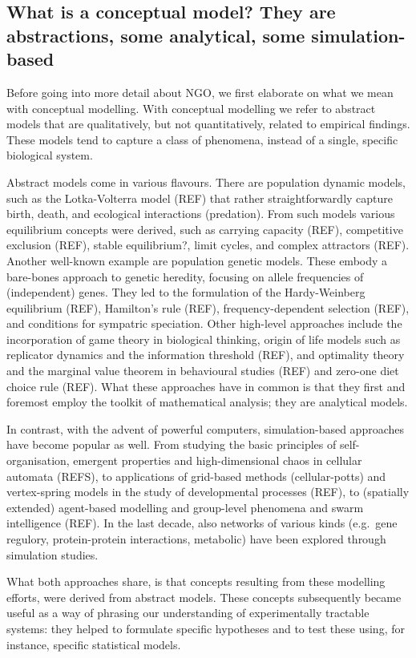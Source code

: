 \subsection{What is a conceptual model? They are abstractions, some analytical, some simulation-based}

Before going into more detail about NGO, we first elaborate on what we mean with conceptual modelling. With conceptual modelling we refer to abstract models that are qualitatively, but not quantitatively, related to empirical findings. These models tend to capture a class of phenomena, instead of a single, specific biological system.

Abstract models come in various flavours. There are population dynamic models, such as the Lotka-Volterra model (REF) that rather straightforwardly capture birth, death, and ecological interactions (predation). From such models various equilibrium concepts were derived, such as carrying capacity (REF), competitive exclusion (REF), stable equilibrium?, limit cycles, and complex attractors (REF). Another well-known example are population genetic models. These embody a bare-bones approach to genetic heredity, focusing on allele frequencies of (independent) genes. They led to the formulation of the Hardy-Weinberg equilibrium (REF), Hamilton’s rule (REF), frequency-dependent selection (REF), and conditions for sympatric speciation. Other high-level approaches include the incorporation of game theory in biological thinking, origin of life models such as replicator dynamics and the information threshold (REF), and optimality theory and the marginal value theorem in behavioural studies (REF) and zero-one diet choice rule (REF). What these approaches have in common is that they first and foremost employ the toolkit of mathematical analysis; they are analytical models.

In contrast, with the advent of powerful computers, simulation-based approaches have become popular as well. From studying the basic principles of self-organisation, emergent properties and high-dimensional chaos in cellular automata (REFS), to applications of grid-based methods (cellular-potts) and vertex-spring models in the study of developmental processes (REF), to (spatially extended) agent-based modelling and group-level phenomena and swarm intelligence (REF). In the last decade, also networks of various kinds (e.g.\ gene regulory, protein-protein interactions, metabolic) have been explored through simulation studies.

What both approaches share, is that concepts resulting from these modelling efforts, were derived from abstract models. These concepts subsequently became useful as a way of phrasing our understanding of experimentally tractable systems: they helped to formulate specific hypotheses and to test these using, for instance, specific statistical models.
  